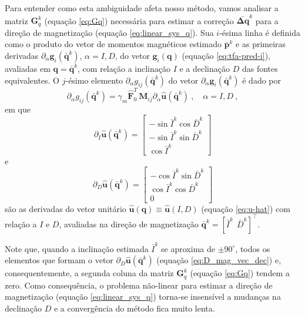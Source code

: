 Para entender como esta ambiguidade afeta nosso método, vamos analisar a matriz $\mathbf{G}_{q}^{k}$ 
(equação \ref{eq:Gq}) necessária para estimar a correção $\bar{\mathbf{\Delta q}}^{k}$ para a direção de 
magnetização (equação \ref{eq:linear_sys_q}). Sua $i$-ésima linha é definida como o produto do vetor de momentos magnéticos 
estimado $\bar{\mathbf{p}}^{k}$ e as primeiras derivadas $\partial_{\alpha} \mathbf{g}_{i}(\bar{\mathbf{q}}^{k})$, $\alpha= I, D$, 
do vetor $\mathbf{g}_{i}(\mathbf{q})$ (equação \ref{eq:tfa-pred-i}), avaliadas em $\mathbf{q} = \bar{\mathbf{q}}^{k}$, com relação 
a inclinação $I$ e a declinação $D$ das fontes equivalentes. O $j$-ésimo elemento $\partial_{\alpha} g_{ij}(\bar{\mathbf{q}}^{k})$ 
do vetor $\partial_{\alpha} \mathbf{g}_{i}(\bar{\mathbf{q}}^{k})$ é dado por
\begin{equation}
\partial_{\alpha} g_{ij}(\bar{\mathbf{q}}^{k}) = 
\gamma_{m}  \hat{\mathbf{F}}_{0}^T \, \mathbf{M}_{ij} 
\partial_{\alpha} \hat{\mathbf{u}}(\bar{\mathbf{q}}^{k}) \: , \quad \alpha = I, D \: ,
\label{eq:D-alpha-gij}
\end{equation}
em que 
\begin{equation}
\partial_{I} \hat{\mathbf{u}}(\bar{\mathbf{q}}^{k}) = 
\begin{bmatrix}
	-\sin \bar{I}^{k} \cos \bar{D}^{k} \\
	-\sin \bar{I}^{k} \sin \bar{D}^{k} \\
	 \cos \bar{I}^{k}
\end{bmatrix}
\label{eq:D_mag_vec_inc}
\end{equation}
e 
\begin{equation}
\partial_{D} \hat{\mathbf{u}}(\bar{\mathbf{q}}^{k}) = 
\begin{bmatrix}
	-\cos \bar{I}^{k} \sin \bar{D}^{k} \\
	 \cos \bar{I}^{k} \cos \bar{D}^{k} \\
	 0
\end{bmatrix}
\label{eq:D_mag_vec_dec}
\end{equation}
são as derivadas do vetor unitário $\hat{\mathbf{u}}(\mathbf{q}) \equiv \hat{\mathbf{u}}(I, D)$ (equação \ref{eq:u-hat})
com relação a $I$ e $D$, avaliadas na direção de magnetização 
$\bar{\mathbf{q}}^{k} = \left[ \bar{I}^{k} \:\: \bar{D}^{k} \right]^{\top}$. 
 
Note que, quando a inclinação estimada $\bar{I}^{k}$ se aproxima de $\pm 90^{\circ}$, todos os elementos que formam o vetor 
$\partial_{D} \hat{\mathbf{u}}(\bar{\mathbf{q}}^{k})$ (equação \ref{eq:D_mag_vec_dec}) e, consequentemente, a segunda coluna 
da matriz $\mathbf{G}_{q}^{k}$ (equação \ref{eq:Gq}) tendem a zero. Como consequência, o problema não-linear para estimar a 
direção de magnetização (equação \ref{eq:linear_sys_q}) torna-se insensível a mudanças na declinação $D$ e a convergência 
do método fica muito lenta. 


